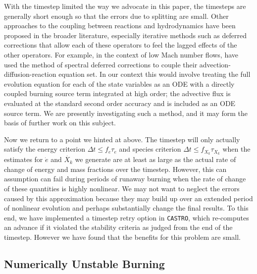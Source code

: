 \documentclass[twocolumn,numberedappendix]{../aastex6}
\newcommand{\castro}{\texttt{CASTRO}}
\begin{document}
With the timestep limited the way we advocate in this paper, 
the timesteps are generally short enough so that the errors 
due to splitting are small. Other approaches to the coupling 
between reactions and hydrodynamics have been proposed in the 
broader literature, especially iterative methods such as 
deferred corrections that allow each of these operators to 
feel the lagged effects of the other operators. For example,
in the context of low Mach number flows, \cite{nonaka:2012} have
used the method of spectral deferred corrections \citep{SDC} to
couple their advection-diffusion-reaction equation set. In our
context this would involve treating the full evolution equation
for each of the state variables as an ODE with a directly coupled
burning source term integrated at high order; the advective
flux is evaluated at the standard second order accuracy
and is included as an ODE source term.
We are presently investigating such a method,
and it may form the basis of further work on this subject.

Now we return to a point we hinted at above. The timestep
will only actually satisfy the energy criterion
$\Delta t \leq f_e \tau_e$ and species criterion
$\Delta t \leq f_{X_k} \tau_{X_k}$ when the estimates for
$\dot{e}$ and $\dot{X_k}$ we generate are at least as large
as the actual rate of change of energy and mass fractions
over the timestep. However, this can assumption can fail
during periods of runaway burning when the rate of change
of these quantities is highly nonlinear. We may not want
to neglect the errors caused by this approximation
because they may build up over an extended period of nonlinear
evolution and perhaps substantially change the final results.
To this end, we have implemented a timestep retry option in
\castro, which re-computes an advance if it violated the
stability criteria as judged from the end of the timestep.
However we have found that the benefits for this problem are
small.

\subsection{Numerically Unstable Burning}
\label{sec:unstable_burning}
\end{document}
